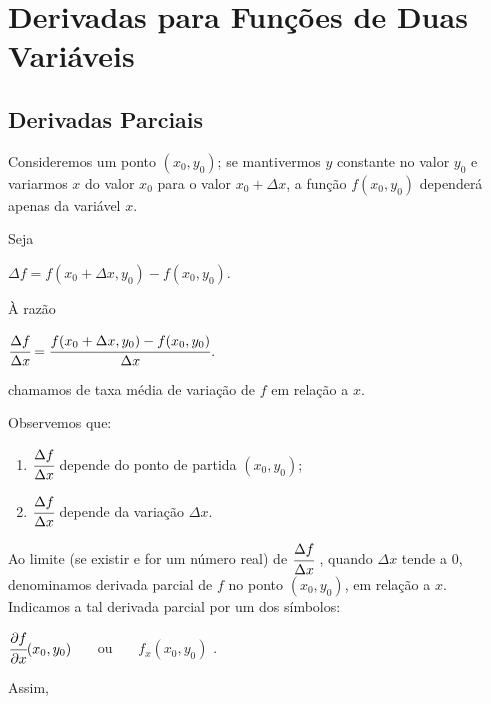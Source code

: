 \section{Derivadas para Funções de Duas Variáveis}

	\subsection{Derivadas Parciais \cite{morettin}}

		Consideremos um ponto $(x_{0}, y_{0})$; se mantivermos $y$ constante no valor $y_{0}$ e variarmos $x$ do valor $x_{0}$ para  o valor $x_{0} + \Delta x$, a função $f(x_{0}, y_{0})$ dependerá apenas da variável $x$.

		\medskip

		Seja

		\bigskip

		$\Delta f = f(x_{0} + \Delta x, y_{0}) - f(x_{0}, y_{0})$.

		\bigskip

		À razão
		
		\bigskip
		
		$\cfrac{\Delta f}{\Delta x} = \cfrac{f(x_{0} + \Delta x, y_{0}) - f(x_{0}, y_{0})}{\Delta x}$.

		\bigskip

		chamamos de taxa média de variação de $f$ em relação a $x$.

		\medskip

		Observemos que:
		
		\begin{enumerate}[label=(\alph*)]

			\item $\cfrac{\Delta f}{\Delta x}$ depende do ponto de partida $(x_{0}, y_{0})$;
			\item $\cfrac{\Delta f}{\Delta x}$ depende da variação $\Delta x$.

		\end{enumerate}

		Ao limite (se existir e for um número real) de $\cfrac{\Delta f}{\Delta x}$ , quando $\Delta x$ tende a $0$, denominamos derivada parcial de $f$ no ponto $(x_{0}, y_{0})$, em relação a $x$. Indicamos a tal derivada parcial por um dos símbolos:

		\bigskip

		$\cfrac{\partial f}{\partial x} (x_{0}, y_{0})$ \ \ \ ou \ \ \ $f_{x}(x_{0}, y_{0})$ .
		
		\bigskip

		Assim,

